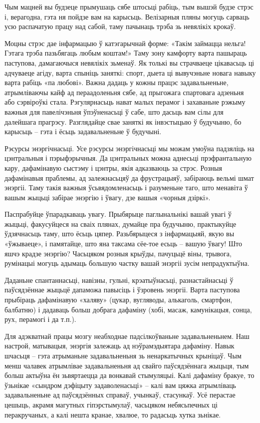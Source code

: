 Чым мацней вы будзеце прымушаць сябе штосьці рабіць, тым вышэй будзе стрэс і, верагодна, гэта ня пойдзе вам на карысьць. Велізарныя пляны могуць сарваць усю распачатую працу над сабой, таму пачынаць трэба зь невялікіх крокаў.

Моцны стрэс дае інфармацыю ў катэгарычнай форме: «Такім займацца нельга! Гэтага трэба пазьбягаць любым коштам!» Таму зону камфорту варта пашыраць паступова, дамагаючыся невялікіх зьменаў. Як толькі вы страчваеце цікавасьць ці адчуваеце агіду, варта спыніць заняткі: спорт, дыета ці вывучэньне новага навыку варта рабіць «па любові». Важна дадаць у кожны працэс задавальненьне, атрымліваючы кайф ад пераадоленьня сябе, ад прыгожага спартовага адзеньня або сэрвіроўкі стала. Рэгулярнасьць нават малых перамог і захаваньне рэжыму важныя для павелічэньня ўпэўненасьці ў сабе, што дасьць вам сілы для далейшага прагрэсу. Разглядайце свае заняткі як інвэстыцыю ў будучыню, бо карысьць – гэта і ёсьць задавальненьне ў будучыні.

Рэсурсы энэргічнасьці. Усе рэсурсы энэргічнасьці мы можам умоўна падзяліць на цэнтральныя і пэрыфэрычныя. Да цэнтральных можна аднесьці прэфрантальную кару, дафамінавую сыстэму і цэнтры, якія адказваюць за стрэс. Розныя дафамінавыя праблемы, ад залежнасьцяў да фрустрацыяў, забіраюць вельмі шмат энэргіі. Таму такія важныя ўсьвядомленасьць і разуменьне таго, што менавіта ў вашым жыцьці забірае энэргію і ўвагу, дзе вашыя «чорныя дзіркі».

Паспрабуйце ўпарадкаваць увагу. Прыбярыце паглынальнікі вашай увагі ў жыцьці, факусуйцеся на сваіх плянах, думайце пра будучыню, практыкуйце ўдзячнасьць таму, што ёсьць цяпер. Разьбярыцеся з інфармацыяй, якую вы «ўжываеце», і памятайце, што яна таксама сёе-тое есьць – вашую ўвагу! Што яшчэ крадзе энэргію? Часьцяком розныя крыўды, пачуцьцё віны, трывога, румінацыі могуць адымаць большую частку вашай энэргіі зусім непрадуктыўна.

Даданьне спантаннасьці, навізны, гульні, крэатыўнасьці, разнастайнасьці ў паўсядзённае жыцьцё дапаможа павысіць і ўзровень энэргіі. Варта паступова прыбіраць дафамінавую «халяву» (цукар, вугляводы, алькаголь, смартфон, балбатню) і дадаваць больш добрага дафаміну (хобі, масаж, камунікацыя, сонца, рух, перамогі і да т.п.).

Для адэкватнай працы мозгу неабходнае падсілкоўваньне задавальненьнем. Наш настрой, матывацыя, энэргія залежаць ад нэўрамэдыятара дафаміну. Навык шчасьця – гэта атрыманьне задавальненьня зь ненаркатычных крыніцаў. Чым менш чалавек атрымлівае задавальненьня ад свайго паўсядзённага жыцьця, тым больш актыўна ён зьвяртаецца да вонкавай стымуляцыі. Калі дафаміну бракуе, то ўзьнікае «сындром дэфіцыту задаволенасьці» – калі вам цяжка атрымліваць задавальненьне ад паўсядзённых справаў, учынкаў, стасункаў. Усё перастае цешыць, акрамя магутных гіпэрстымулаў, часьцяком небясьпечных ці перакручаных, а калі нешта кранае, хвалюе, то радасьць хутка зьнікае.

